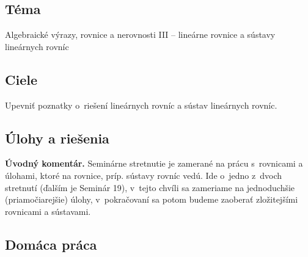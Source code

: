 
\subsection*{Téma}
Algebraické výrazy, rovnice a nerovnosti III -- lineárne rovnice a sústavy lineárnych rovníc

\subsection*{Ciele}
Upevniť poznatky o~riešení lineárnych rovníc a sústav lineárnych rovníc.

\subsection*{Úlohy a riešenia}


\textbf{Úvodný komentár.} Seminárne stretnutie je zamerané na prácu s~rovnicami a úlohami, ktoré na rovnice, príp. sústavy rovníc vedú. Ide o~jedno z~dvoch stretnutí (ďalším je Seminár 19), v~tejto chvíli sa zameriame na jednoduchšie (priamočiarejšie) úlohy, v~pokračovaní sa potom budeme zaoberať zložitejšími rovnicami a sústavami.























\subsection*{Domáca práca}








